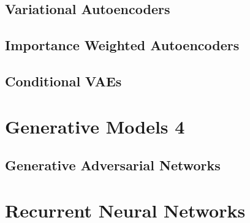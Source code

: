 \documentclass{article}
\theoremstyle{definition}
\theoremstyle{remark}
\theoremstyle{definition}
\begin{document}
\subsection{Variational Autoencoders} 

\subsection{Importance Weighted Autoencoders} 

\subsection{Conditional VAEs} 


\section{Generative Models 4} 

\subsection{Generative Adversarial Networks} 

\section{Recurrent Neural Networks}
\end{document}
